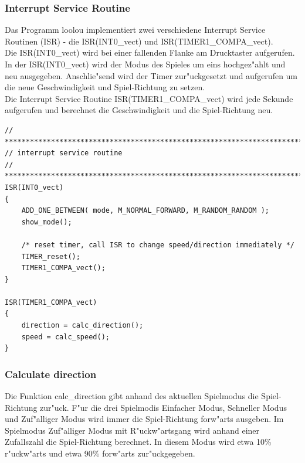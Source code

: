 \subsubsection{Interrupt Service Routine}

Das Programm loolou implementiert zwei verschiedene Interrupt Service Routinen (ISR) - die ISR(INT0\_vect) und ISR(TIMER1\_COMPA\_vect). \\
Die ISR(INT0\_vect) wird bei einer fallenden Flanke am Drucktaster aufgerufen. In der ISR(INT0\_vect) wird der Modus des Spieles um eins hochgez"ahlt und neu ausgegeben. Anschlie"send wird der Timer zur"uckgesetzt und aufgerufen um die neue Geschwindigkeit und Spiel-Richtung zu setzen. \\
Die Interrupt Service Routine ISR(TIMER1\_COMPA\_vect) wird jede Sekunde aufgerufen und berechnet die Geschwindigkeit und die Spiel-Richtung neu.

\vspace{0.5cm}
\begin{lstlisting}[caption={Interrupt Service Routine},label=lst:isr]
// ****************************************************************************
// interrupt service routine
// ***************************************************************************/
ISR(INT0_vect)
{
	ADD_ONE_BETWEEN( mode, M_NORMAL_FORWARD, M_RANDOM_RANDOM );
	show_mode();

	/* reset timer, call ISR to change speed/direction immediately */
	TIMER_reset();
	TIMER1_COMPA_vect();
}

ISR(TIMER1_COMPA_vect)
{
	direction = calc_direction();
	speed = calc_speed();
}
\end{lstlisting}
\vspace{0.5cm}

\subsubsection{Calculate direction}

Die Funktion calc\_direction gibt anhand des aktuellen Spielmodus die Spiel-Richtung zur"uck.
F"ur die drei Spielmodis \grqq{}Einfacher Modus\grqq{}, \grqq{}Schneller Modus\grqq{} und \grqq{}Zuf"alliger Modus\grqq{} wird immer die Spiel-Richtung \grqq{}forw"arts\grqq{} ausgeben.
Im Spielmodus \grqq{}Zuf"alliger Modus mit R"uckw"artsgang\grqq{} wird anhand einer Zufallszahl die Spiel-Richtung berechnet. In diesem Modus wird etwa 10\% \grqq{}r"uckw"arts\grqq{} und etwa 90\% \grqq{}forw"arts\grqq{} zur"uckgegeben.

